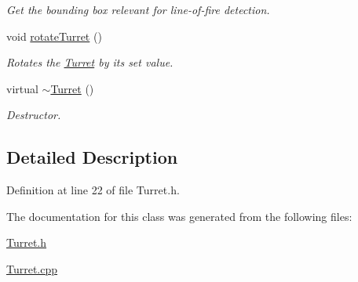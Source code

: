 \begin{DoxyCompactItemize}
\begin{DoxyCompactList}\small\item\em Get the bounding box relevant for line-\/of-\/fire detection. \end{DoxyCompactList}\item 
\hypertarget{class_turret_a7e66153beba3e6526d1c26be106d7269}{void \hyperlink{class_turret_a7e66153beba3e6526d1c26be106d7269}{rotate\+Turret} ()}\label{class_turret_a7e66153beba3e6526d1c26be106d7269}

\begin{DoxyCompactList}\small\item\em Rotates the \hyperlink{class_turret}{Turret} by its set value. \end{DoxyCompactList}\item 
\hypertarget{class_turret_add5c91873b2baa27a3aa7a2a4c55e58c}{virtual \hyperlink{class_turret_add5c91873b2baa27a3aa7a2a4c55e58c}{$\sim$\+Turret} ()}\label{class_turret_add5c91873b2baa27a3aa7a2a4c55e58c}

\begin{DoxyCompactList}\small\item\em Destructor. \end{DoxyCompactList}\end{DoxyCompactItemize}


\subsection{Detailed Description}


Definition at line 22 of file Turret.\+h.



The documentation for this class was generated from the following files\+:\begin{DoxyCompactItemize}
\item 
\hyperlink{_turret_8h}{Turret.\+h}\item 
\hyperlink{_turret_8cpp}{Turret.\+cpp}\end{DoxyCompactItemize}
